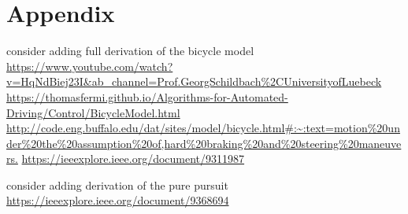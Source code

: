 \documentclass[a4paper,12pt,sort&compress]{article}
\begin{document}
\newpage
\section{Appendix}
consider adding full derivation of the bicycle model \url{https://www.youtube.com/watch?v=HqNdBiej23I&ab_channel=Prof.GeorgSchildbach%2CUniversityofLuebeck}
\url{https://thomasfermi.github.io/Algorithms-for-Automated-Driving/Control/BicycleModel.html}
\url{http://code.eng.buffalo.edu/dat/sites/model/bicycle.html#:~:text=motion%20under%20the%20assumption%20of,hard%20braking%20and%20steering%20maneuvers.}
\url{https://ieeexplore.ieee.org/document/9311987}

consider adding derivation of the pure pursuit
\url{https://ieeexplore.ieee.org/document/9368694}


\newpage
\end{document}

